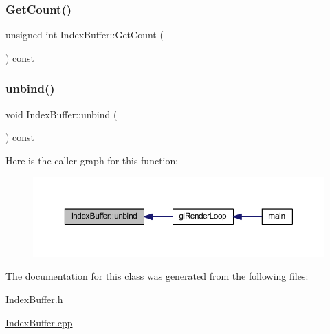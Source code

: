 \subsubsection{\texorpdfstring{Get\+Count()}{GetCount()}}
{\footnotesize\ttfamily unsigned int Index\+Buffer\+::\+Get\+Count (\begin{DoxyParamCaption}{ }\end{DoxyParamCaption}) const\hspace{0.3cm}{\ttfamily [inline]}}

\mbox{\label{class_index_buffer_a29815a01631f16261b0c7e1b9a6959ea}} 
\subsubsection{\texorpdfstring{unbind()}{unbind()}}
{\footnotesize\ttfamily void Index\+Buffer\+::unbind (\begin{DoxyParamCaption}{ }\end{DoxyParamCaption}) const}

Here is the caller graph for this function\+:
\nopagebreak
\begin{figure}[H]
\begin{center}
\leavevmode
\includegraphics[width=350pt]{class_index_buffer_a29815a01631f16261b0c7e1b9a6959ea_icgraph}
\end{center}
\end{figure}


The documentation for this class was generated from the following files\+:\begin{DoxyCompactItemize}
\item 
\mbox{\hyperlink{_index_buffer_8h}{Index\+Buffer.\+h}}\item 
\mbox{\hyperlink{_index_buffer_8cpp}{Index\+Buffer.\+cpp}}\end{DoxyCompactItemize}
